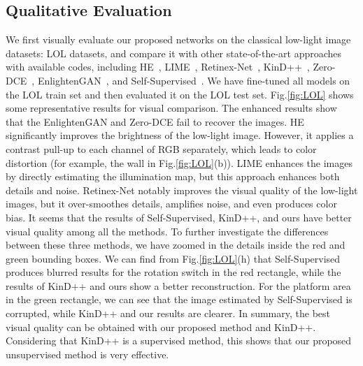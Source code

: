 \documentclass[journal]{IEEEtran}
\begin{document}
\subsection{Qualitative Evaluation}
We first visually evaluate our proposed networks on the classical low-light image datasets: LOL datasets, and compare it with other state-of-the-art approaches with available codes, including HE~\cite{pizer1990contrast}, LIME~\cite{guo2016lime}, Retinex-Net~\cite {Chen2018Retinex}, KinD++~\cite{zhang2021beyond}, Zero-DCE~\cite{guo2020zero}, EnlightenGAN~\cite{jiang2021enlightengan}, and Self-Supervised~\cite{zhang2020self}. We have fine-tuned all models on the LOL train set and then evaluated it on the LOL test set. Fig.\ref{fig:LOL} shows some representative results for visual comparison. The enhanced results show that the EnlightenGAN and Zero-DCE fail to recover the images. HE significantly improves the brightness of the low-light image. However, it applies a contrast pull-up to each channel of RGB separately, which leads to color distortion (for example, the wall in Fig.\ref{fig:LOL}(b)). LIME enhances the images by directly estimating the illumination map, but this approach enhances both details and noise. Retinex-Net notably improves the visual quality of the low-light images, but it over-smoothes details, amplifies noise, and even produces color bias. It seems that the results of Self-Supervised, KinD++, and ours have better visual quality among all the methods. To further investigate the differences between these three methods, we have zoomed in the details inside the red and green bounding boxes. We can find from Fig.\ref{fig:LOL}(h) that Self-Supervised produces blurred results for the rotation switch in the red rectangle, while the results of KinD++ and ours show a better reconstruction. For the platform area in the green rectangle, we can see that the image estimated by Self-Supervised is corrupted, while KinD++ and our results are clearer. In summary, the best visual quality can be obtained with our proposed method and KinD++. Considering that KinD++ is a supervised method, this shows that our proposed unsupervised method is very effective.
\end{document}

